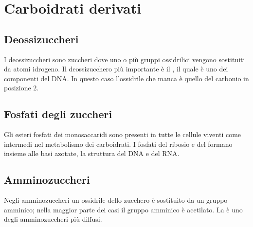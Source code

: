 \section{Carboidrati derivati}


\subsection{Deossizuccheri}
I deossizuccheri sono zuccheri dove uno o più gruppi ossidrilici vengono sostituiti da atomi idrogeno. Il deossizucchero più importante è il , il quale è uno dei componenti del DNA. In questo caso l'ossidrile che manca è quello del carbonio in posizione 2.

\begin{figure}[H]
	\centering
\end{figure}

\subsection{Fosfati degli zuccheri}
Gli esteri fosfati dei monosaccaridi sono presenti in tutte le cellule viventi come intermedi nel metabolismo dei carboidrati. I fosfati del ribosio e del  formano insieme alle basi azotate, la struttura del DNA e del RNA.

\begin{figure}[H]
	\centering
\end{figure}

\subsection{Amminozuccheri}
Negli amminozuccheri un ossidrile dello zucchero è sostituito da un gruppo amminico; nella maggior parte dei casi il gruppo amminico è acetilato. La  è uno degli amminozuccheri più diffusi.

\begin{figure}[H]
	\centering
\end{figure}